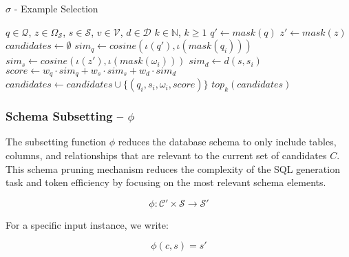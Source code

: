 \begin{algorithm}
\caption{$\sigma$ - Example Selection}\label{algorithms:sigma}
\begin{algorithmic}[1]
\Require $q \in \mathcal{Q}$, $z \in \Omega_{\mathcal{S}}$, $s \in \mathcal{S}$, $v \in \mathcal{V}$, $d \in \mathcal{D}$
\Require $k \in \mathbb{N}$, $k \geq 1$                            
\State $q' \gets mask(q)$                                          
\State $z' \gets mask(z)$                                          
\State $candidates  \gets \emptyset$                               
                            
    \State $sim_q \gets cosine(\iota(q'), \iota(mask(q_i)))$       
    \State $sim_s \gets cosine(\iota(z'), \iota(mask(\omega_i)))$  
    \State $sim_d \gets d(s, s_i)$                                 
    \State $score \gets w_q \cdot sim_q + w_s \cdot sim_s + w_d \cdot sim_d$
    \State $candidates \gets candidates \cup \{(q_i, s_i, \omega_i, score)\}$
\EndFor
\State \Return $top_{k}(candidates)$                             
\end{algorithmic}
\end{algorithm}

\subsubsection{Schema Subsetting – $\phi$}\label{design:subsetting-function}

The subsetting function $\phi$ reduces the database schema to only include
tables, columns, and relationships that are relevant to the current set of candidates
$C$. This schema pruning mechanism reduces the complexity of the SQL generation task
and token efficiency by focusing on the most relevant schema elements.

$$
\phi: \mathcal{C}' \times \mathcal{S} \rightarrow \mathcal{S}'
$$

\vspace{0.5em}

For a specific input instance, we write:

$$
\phi(c, s) = s'
$$

\vspace{0.5em}

